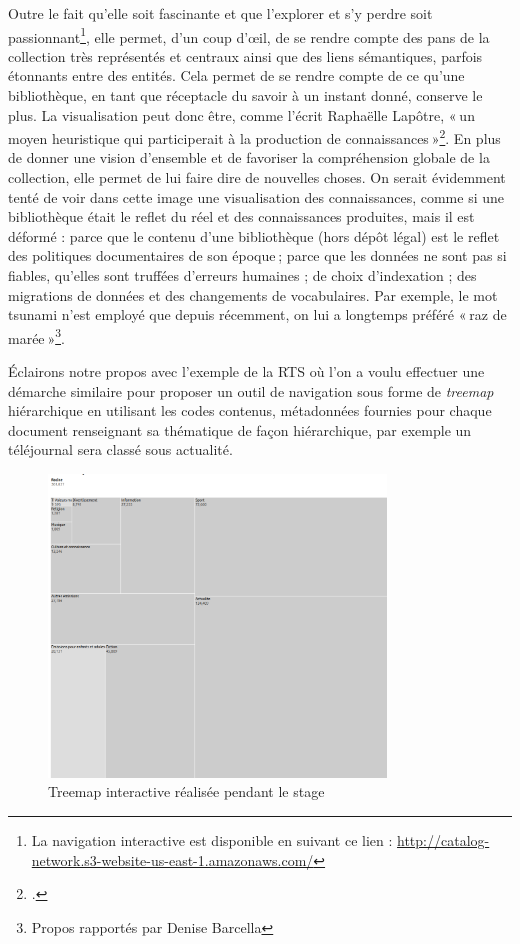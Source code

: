 Outre le fait qu’elle soit fascinante et que l’explorer et s’y perdre soit passionnant\footnote{La navigation interactive est disponible en suivant ce lien : \url{ http://catalog-network.s3-website-us-east-1.amazonaws.com/}}, elle permet, d’un coup d’œil, de se rendre compte des pans de la collection très représentés et centraux ainsi que des liens sémantiques, parfois étonnants entre des entités. Cela permet de se rendre compte de ce qu’une bibliothèque, en tant que réceptacle du savoir à un instant donné, conserve le plus. La visualisation peut donc être, comme l’écrit Raphaëlle Lapôtre, « un moyen heuristique qui participerait à la production de connaissances »\footcite[§ 23]{lapotre_visualiser_2016}. En plus de donner une vision d’ensemble et de favoriser la compréhension globale de la collection, elle permet de lui faire dire de nouvelles choses. On serait évidemment tenté de voir dans cette image une visualisation des connaissances, comme si une bibliothèque était le reflet du réel et des connaissances produites, mais il est déformé : parce que le contenu d’une bibliothèque (hors dépôt légal) est le reflet des politiques documentaires de son époque ; parce que les données ne sont pas si fiables, qu’elles sont truffées d’erreurs humaines ; de choix d’indexation ; des migrations de données et des changements de vocabulaires. Par exemple, le mot tsunami n’est employé que depuis récemment, on lui a longtemps préféré « raz de marée »\footnote{Propos rapportés par Denise Barcella}.

Éclairons notre propos avec l’exemple de la RTS où l’on a voulu effectuer une démarche similaire pour proposer un outil de navigation sous forme de \textit{treemap} hiérarchique en utilisant les codes contenus, métadonnées fournies pour chaque document renseignant sa thématique de façon hiérarchique, par exemple un téléjournal sera classé sous actualité.



\begin{figure}[h!]
	\centering
	\includegraphics[width=0.8\textwidth]{images/image13.png}
	\caption{Treemap interactive réalisée pendant le stage}
	\label{fig:image13}
\end{figure}




